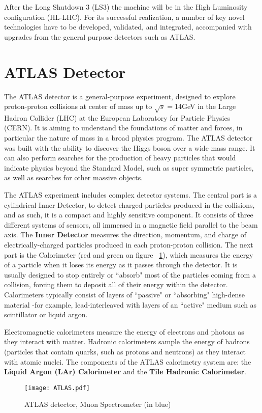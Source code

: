 After the Long Shutdown 3 (LS3) the machine will be in the High Luminosity configuration (HL-LHC). For its successful
realization, a number of key novel technologies have to be developed, validated, and integrated, accompanied with
upgrades from the
general purpose detectors such as ATLAS.


\section{ATLAS Detector}

The ATLAS detector is a general-purpose experiment, designed to explore proton-proton collisions at center of mass up to
$\sqrt{s}=$14GeV in the Large Hadron Collider (LHC) at the European Laboratory for Particle Physics (CERN). It is aiming
to understand the foundations of matter and forces, in particular the nature of mass in a broad physics program. The
ATLAS detector was built with the ability to discover the Higgs boson over a wide mass range. It can also perform
searches for the production of heavy particles that would indicate physics beyond the Standard Model, such as super
symmetric particles, as well as searches for other massive objects. \par 

The ATLAS experiment includes complex detector systems. The central part is a cylindrical Inner Detector, to detect
charged particles produced in the collisions, and as such, it is a compact and highly sensitive component. It consists of
three different systems of sensors, all immersed in a magnetic field parallel to the beam axis. The {\bf Inner Detector}
measures the direction, momentum, and charge of electrically-charged particles produced in each proton-proton collision.
The next part is the Calorimeter (red and green on figure ~\ref{fig:ATLAS}), which  measures the energy of a particle
when it loses its energy as it passes through the detector. It is usually designed to stop entirely or ``absorb" most of
the particles coming from a collision, forcing them to deposit all of their energy within the detector. Calorimeters
typically consist of layers of ``passive" or ``absorbing" high-dense material -for example, lead-interleaved with layers
of an ``active" medium such as scintillator or liquid argon.\par
Electromagnetic calorimeters measure the energy of electrons and photons as they interact with matter. Hadronic
calorimeters sample the energy of hadrons (particles that contain quarks, such as protons and neutrons) as they interact
with atomic nuclei. The components of the ATLAS calorimetry system are: the {\bf Liquid Argon (LAr) Calorimeter} and the
{\bf Tile Hadronic Calorimeter}.\par
\begin{figure}[H]
		\centering
		\texttt{[image: ATLAS.pdf]}
		\caption{ATLAS detector, Muon Spectrometer (in blue)}\label{fig:ATLAS}
\end{figure}

